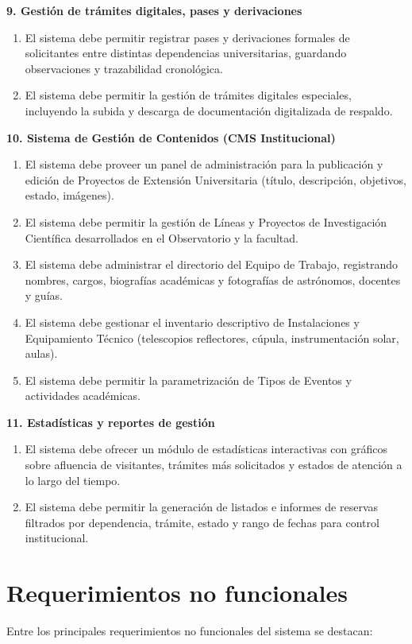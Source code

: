 \textbf{9. Gestión de trámites digitales, pases y derivaciones}
\begin{enumerate}[resume]
    \item El sistema debe permitir registrar pases y derivaciones formales de solicitantes entre distintas dependencias universitarias, guardando observaciones y trazabilidad cronológica.
    \item El sistema debe permitir la gestión de trámites digitales especiales, incluyendo la subida y descarga de documentación digitalizada de respaldo.
\end{enumerate}

\textbf{10. Sistema de Gestión de Contenidos (CMS Institucional)}
\begin{enumerate}[resume]
    \item El sistema debe proveer un panel de administración para la publicación y edición de Proyectos de Extensión Universitaria (título, descripción, objetivos, estado, imágenes).
    \item El sistema debe permitir la gestión de Líneas y Proyectos de Investigación Científica desarrollados en el Observatorio y la facultad.
    \item El sistema debe administrar el directorio del Equipo de Trabajo, registrando nombres, cargos, biografías académicas y fotografías de astrónomos, docentes y guías.
    \item El sistema debe gestionar el inventario descriptivo de Instalaciones y Equipamiento Técnico (telescopios reflectores, cúpula, instrumentación solar, aulas).
    \item El sistema debe permitir la parametrización de Tipos de Eventos y actividades académicas.
\end{enumerate}

\textbf{11. Estadísticas y reportes de gestión}
\begin{enumerate}[resume]
    \item El sistema debe ofrecer un módulo de estadísticas interactivas con gráficos sobre afluencia de visitantes, trámites más solicitados y estados de atención a lo largo del tiempo.
    \item El sistema debe permitir la generación de listados e informes de reservas filtrados por dependencia, trámite, estado y rango de fechas para control institucional.
\end{enumerate}

\section{Requerimientos no funcionales}
Entre los principales requerimientos no funcionales del sistema se destacan:


